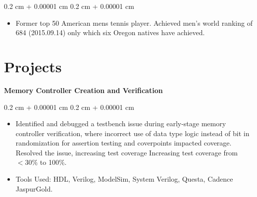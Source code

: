 \documentclass[10pt, letterpaper]{article}
\newenvironment{highlights}{
    \begin{itemize}[
        topsep=0.10 cm,
        parsep=0.10 cm,
        partopsep=0pt,
        itemsep=0pt,
        leftmargin=0.4 cm + 10pt
    ]
}{
    \end{itemize}
} %
\newenvironment{onecolentry}{
    \begin{adjustwidth}{
        0.2 cm + 0.00001 cm
    }{
        0.2 cm + 0.00001 cm
    }
}{
    \end{adjustwidth}
} %
\newenvironment{twocolentry}[2][]{
    \onecolentry
    \def\secondColumn{#2}
    \setcolumnwidth{\fill, 4.5 cm}
    \begin{paracol}{2}
}{
    \switchcolumn \raggedleft \secondColumn
    \end{paracol}
    \endonecolentry
} %
\let\hrefWithoutArrow\href
\renewcommand{\href}[2]{\hrefWithoutArrow{#1}{\ifthenelse{\equal{#2}{}}{ }{#2 }\raisebox{.15ex}{\footnotesize \faExternalLink*}}}
\begin{document}
        \vspace{0.10 cm}
        \begin{onecolentry}
            \begin{highlights}
                \item Former top 50 American mens tennis player. Achieved men's world ranking of 684 (2015.09.14) only which six Oregon natives have achieved. 
            \end{highlights}
        \end{onecolentry}
    \section{Projects}

            \textbf{Memory Controller Creation and Verification}

        \vspace{0.10 cm}
        \begin{onecolentry}
            \begin{highlights}
                \item Identified and debugged a testbench issue during early-stage memory controller verification, where incorrect use of data type logic instead of bit in randomization for assertion testing and coverpoints impacted coverage. Resolved the issue, increasing test coverage Increasing test coverage from \( < 30\% \) to 100\%.
                \item Tools Used: HDL, Verilog, ModelSim, System Verilog, Questa, Cadence JaspurGold.
            \end{highlights}
        \end{onecolentry}




        
\end{document}
